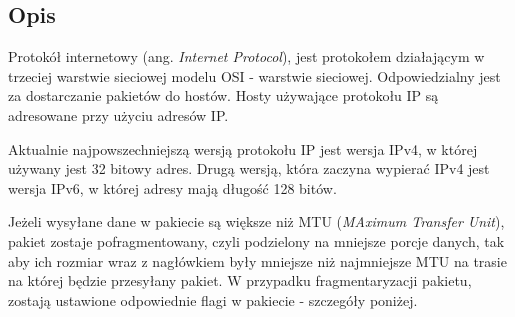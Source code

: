 \documentclass[a4paper,12pt,oneside]{book}
\begin{document}
		\subsection{Opis}
			Protokół internetowy (ang. \textit{Internet Protocol}), jest protokołem działającym w trzeciej warstwie sieciowej modelu OSI - warstwie sieciowej.
			Odpowiedzialny jest za dostarczanie pakietów do hostów.
			Hosty używające protokołu IP są adresowane przy użyciu adresów IP.

			Aktualnie najpowszechniejszą wersją protokołu IP jest wersja IPv4, w której używany jest 32 bitowy adres.
			Drugą wersją, która zaczyna wypierać IPv4 jest wersja IPv6, w której adresy mają długość 128 bitów.

			Jeżeli wysyłane dane w pakiecie są większe niż MTU (\textit{MAximum Transfer Unit}), pakiet zostaje pofragmentowany, czyli podzielony na mniejsze porcje danych, tak aby ich rozmiar wraz z nagłówkiem były mniejsze niż najmniejsze MTU na trasie na której będzie przesyłany pakiet.
			W przypadku fragmentaryzacji pakietu, zostają ustawione odpowiednie flagi w pakiecie - szczegóły poniżej.
\end{document}
